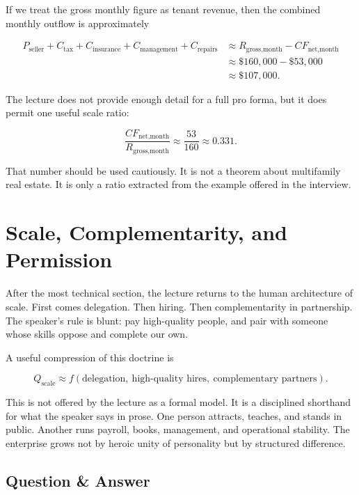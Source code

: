 If we treat the gross monthly figure as tenant revenue, then the combined monthly outflow is approximately

\begin{align}
P_{\text{seller}}+C_{\text{tax}}+C_{\text{insurance}}+C_{\text{management}}+C_{\text{repairs}}
&\approx
R_{\text{gross,month}}-CF_{\text{net,month}}\\
&\approx
\$160{,}000-\$53{,}000\\
&\approx
\$107{,}000.
\end{align}

The lecture does not provide enough detail for a full pro forma, but it does permit one useful scale ratio:

\begin{equation}
\frac{CF_{\text{net,month}}}{R_{\text{gross,month}}}
\approx
\frac{53}{160}
\approx
0.331.
\end{equation}

That number should be used cautiously. It is not a theorem about multifamily real estate. It is only a ratio extracted from the example offered in the interview.

\section{Scale, Complementarity, and Permission}

After the most technical section, the lecture returns to the human architecture of scale. First comes delegation. Then hiring. Then complementarity in partnership. The speaker's rule is blunt: pay high-quality people, and pair with someone whose skills oppose and complete our own.

A useful compression of this doctrine is

\begin{equation}
Q_{\text{scale}}
\approx
f(\text{delegation},\ \text{high-quality hires},\ \text{complementary partners}).
\end{equation}

This is not offered by the lecture as a formal model. It is a disciplined shorthand for what the speaker says in prose. One person attracts, teaches, and stands in public. Another runs payroll, books, management, and operational stability. The enterprise grows not by heroic unity of personality but by structured difference.

\subsection{Question \& Answer}


